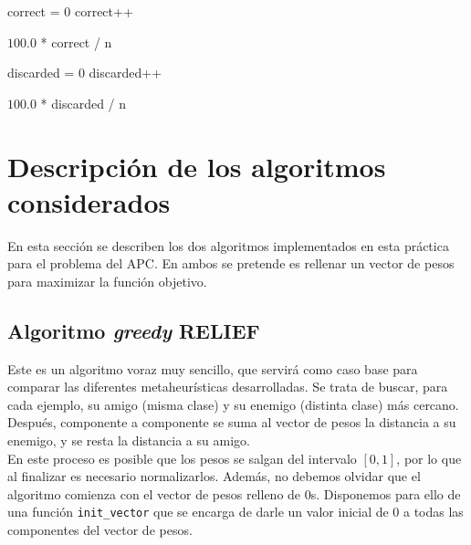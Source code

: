 \documentclass[12pt]{article}
\begin{document}
\begin{algorithm}[H]
\begin{algorithmic}

     
     \State correct = $0$
       
            \State correct++

  \Return $100.0$ * correct / n
  \EndFunction
\end{algorithmic}
\end{algorithm}

\begin{algorithm}[h]
\begin{algorithmic}

     
     \State discarded = $0$
       
            \State discarded++

  \Return $100.0$ * discarded / n
  \EndFunction
\end{algorithmic}
\end{algorithm}

\newpage
\section{Descripción de los algoritmos considerados}
En esta sección se describen los dos algoritmos implementados en esta práctica para el problema del APC. En ambos se pretende es rellenar un vector de pesos para maximizar la función objetivo.

\subsection*{Algoritmo \textit{greedy} RELIEF}

Este es un algoritmo voraz muy sencillo, que servirá como caso base para comparar las diferentes metaheurísticas desarrolladas. Se trata de buscar, para cada ejemplo, su amigo (misma clase) y su enemigo (distinta clase) más cercano. Después, componente a componente se suma al vector de pesos la distancia a su enemigo, y se resta la distancia a su amigo.\\

En este proceso es posible que los pesos se salgan del intervalo $[0,1]$, por lo que al finalizar es necesario normalizarlos. Además, no debemos olvidar que el algoritmo comienza con el vector de pesos relleno de $0$s. Disponemos para ello de una función \verb|init_vector| que se encarga de darle un valor inicial de $0$ a todas las componentes del vector de pesos.\\
\end{document}
